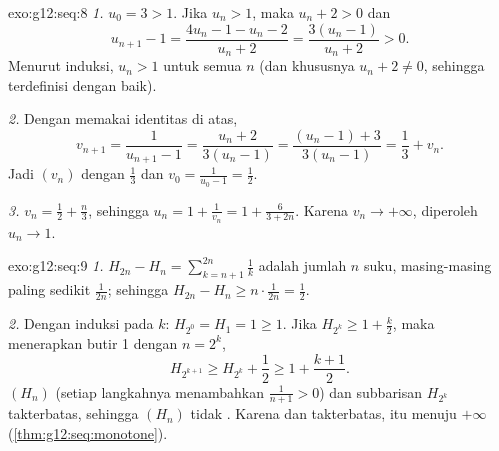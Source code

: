 \begin{solution}{exo:g12:seq:8}
\emph{1.} $u_0 = 3 > 1$. Jika $u_n > 1$, maka $u_n + 2 > 0$ dan
\[
u_{n+1} - 1 = \frac{4u_n - 1 - u_n - 2}{u_n + 2} = \frac{3(u_n - 1)}{u_n + 2} > 0 .
\]
Menurut induksi, $u_n > 1$ untuk semua $n$ (dan khususnya $u_n + 2 \neq 0$,
sehingga  terdefinisi dengan baik).

\emph{2.} Dengan memakai identitas di atas,
\[
v_{n+1} = \frac{1}{u_{n+1} - 1} = \frac{u_n + 2}{3(u_n - 1)}
= \frac{(u_n - 1) + 3}{3(u_n - 1)} = \frac{1}{3} + v_n .
\]
Jadi $(v_n)$  dengan  $\frac13$ dan
$v_0 = \frac{1}{u_0 - 1} = \frac12$.

\emph{3.} $v_n = \frac12 + \frac{n}{3}$, sehingga
$u_n = 1 + \frac{1}{v_n} = 1 + \frac{6}{3 + 2n}$. Karena $v_n \to +\infty$,
diperoleh $u_n \to 1$.
\end{solution}

\begin{solution}{exo:g12:seq:9}
\emph{1.} $H_{2n} - H_n = \sum_{k=n+1}^{2n} \frac{1}{k}$ adalah jumlah $n$
suku, masing-masing paling sedikit $\frac{1}{2n}$; sehingga
$H_{2n} - H_n \geq n \cdot \frac{1}{2n} = \frac12$.

\emph{2.} Dengan induksi pada $k$: $H_{2^0} = H_1 = 1 \geq 1$. Jika
$H_{2^k} \geq 1 + \frac{k}{2}$, maka menerapkan butir 1 dengan $n = 2^k$,
\[
H_{2^{k+1}} \geq H_{2^k} + \frac12 \geq 1 + \frac{k+1}{2}.
\]
 $(H_n)$  (setiap langkahnya menambahkan $\frac{1}{n+1} > 0$) dan
subbarisan $H_{2^k}$ takterbatas, sehingga $(H_n)$ tidak .
Karena  dan takterbatas,  itu menuju $+\infty$
(\cref{thm:g12:seq:monotone}).
\end{solution}

